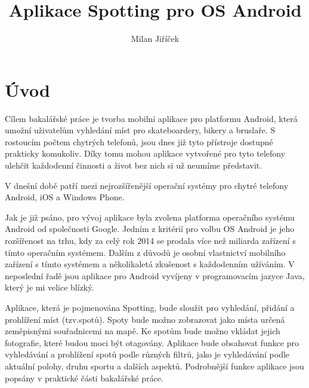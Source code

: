 \documentclass[12pt]{article}
\title{Aplikace Spotting pro OS Android}
\author{Milan Jiříček}
\begin{document}
\maketitle

\newpage

\section{Úvod}
Cílem bakalářské práce je tvorba mobilní aplikace pro platformu Android, která umožní uživatelům vyhledání míst pro skateboardery, bikery a bruslaře. S rostoucím počtem chytrých telefonů, jsou dnes již tyto přístroje dostupné prakticky komukoliv. Díky tomu mohou aplikace vytvořené pro tyto telefony ulehčit každodenní činnosti a život bez nich si už neumíme představit.

V dnešní době patří mezi nejrozšířenější operační systémy pro chytré telefony Android, iOS a Windows Phone.

Jak je již psáno, pro vývoj aplikace byla zvolena platforma operačního systému Android od společnosti Google. Jedním z kritérií pro volbu OS Android je jeho rozšířenost na trhu, kdy za celý rok 2014 se prodala více než miliarda zařízení s tímto operačním systémem. Dalším z důvodů je osobní vlastnictví mobilního zařízení s tímto systémem a několikaletá zkušenost s každodenním užíváním. V neposlední řadě jsou aplikace pro Android vyvíjeny v programovacím jazyce Java, který je mi velice blízký.

Aplikace, která je pojmenována Spotting, bude sloužit pro vyhledání, přidání a prohlížení míst (tzv.spotů). Spoty bude možno zobrazovat jako místa určená zeměpisnými souřadnicemi na mapě. Ke spotům bude možno vkládat jejich fotografie, které budou moci být otagovány. Aplikace bude obsahovat funkce pro vyhledávání a prohlížení spotů  podle různých filtrů, jako je vyhledávání podle aktuální polohy, druhu sportu a dalších aspektů. Podrobnější funkce aplikace jsou popsány v praktické části bakalářské práce.
\newpage
\end{document}
